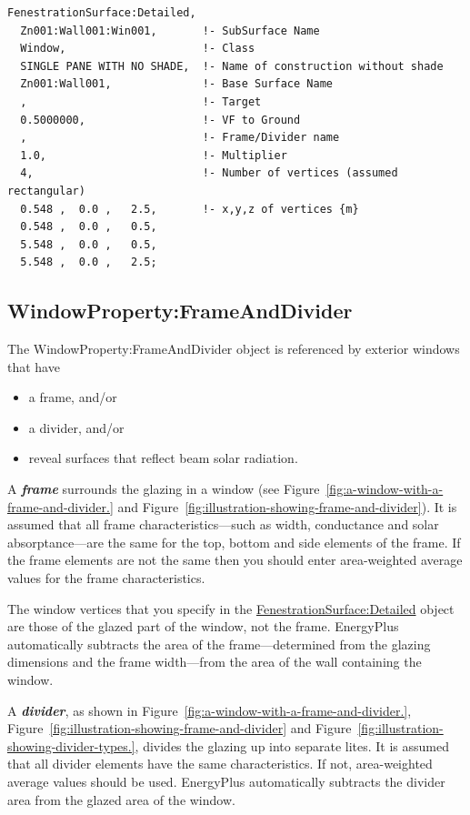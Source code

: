 \begin{lstlisting}
FenestrationSurface:Detailed,
  Zn001:Wall001:Win001,       !- SubSurface Name
  Window,                     !- Class
  SINGLE PANE WITH NO SHADE,  !- Name of construction without shade
  Zn001:Wall001,              !- Base Surface Name
  ,                           !- Target
  0.5000000,                  !- VF to Ground
  ,                           !- Frame/Divider name
  1.0,                        !- Multiplier
  4,                          !- Number of vertices (assumed rectangular)
  0.548 ,  0.0 ,   2.5,       !- x,y,z of vertices {m}
  0.548 ,  0.0 ,   0.5,
  5.548 ,  0.0 ,   0.5,
  5.548 ,  0.0 ,   2.5;
\end{lstlisting}

\subsection{WindowProperty:FrameAndDivider}\label{windowpropertyframeanddivider}

The WindowProperty:FrameAndDivider object is referenced by exterior windows that have

\begin{itemize}
\item
  a frame, and/or
\item
  a divider, and/or
\item
  reveal surfaces that reflect beam solar radiation.
\end{itemize}

A \textbf{\emph{frame}} surrounds the glazing in a window (see Figure~\ref{fig:a-window-with-a-frame-and-divider.} and Figure~\ref{fig:illustration-showing-frame-and-divider}). It is assumed that all frame characteristics---such as width, conductance and solar absorptance---are the same for the top, bottom and side elements of the frame. If the frame elements are not the same then you should enter area-weighted average values for the frame characteristics.

The window vertices that you specify in the \hyperref[fenestrationsurfacedetailed]{FenestrationSurface:Detailed} object are those of the glazed part of the window, not the frame. EnergyPlus automatically subtracts the area of the frame---determined from the glazing dimensions and the frame width---from the area of the wall containing the window.

A \textbf{\emph{divider}}, as shown in Figure~\ref{fig:a-window-with-a-frame-and-divider.}, Figure~\ref{fig:illustration-showing-frame-and-divider} and Figure~\ref{fig:illustration-showing-divider-types.}, divides the glazing up into separate lites. It is assumed that all divider elements have the same characteristics. If not, area-weighted average values should be used. EnergyPlus automatically subtracts the divider area from the glazed area of the window.

